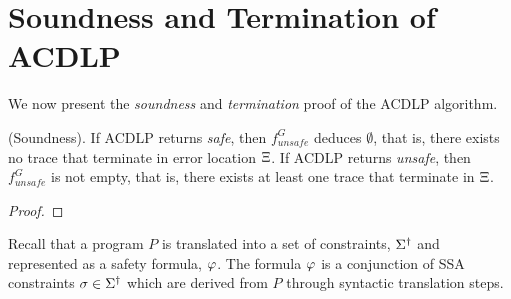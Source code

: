 \section{Soundness and Termination of ACDLP}
%
We now present the \emph{soundness} and \emph{termination} proof of the ACDLP algorithm.  


\begin{theorem} (Soundness).  If ACDLP returns \emph{safe}, then $f_{unsafe}^G$ 
deduces $\emptyset$, that is, there exists no trace that terminate in error 
location $\Xi$.  If ACDLP returns \emph{unsafe}, then $f_{unsafe}^G$ is not 
empty, that is, there exists at least one trace that terminate in $\Xi$.
\end{theorem}

\begin{proof}

\end{proof}


Recall that a program $P$ is translated into a set of constraints, $\Sigma^\dagger$ 
and represented as a safety formula, $\varphi$.  The formula $\varphi$ is a 
conjunction of SSA constraints $\sigma \in \Sigma^\dagger$ which are derived 
from $P$ through syntactic translation steps. 


